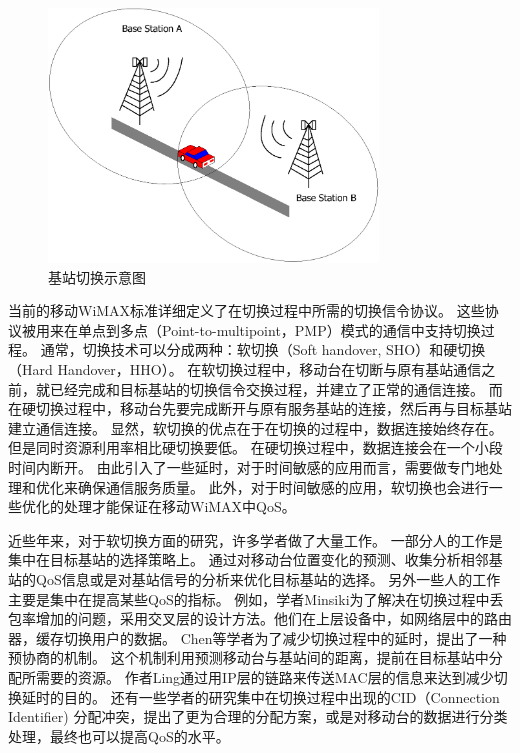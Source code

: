 \begin{figure}[t]
\begin{centering}
\includegraphics[height=6.75cm]{../figures/iccs_handover_bs}
\caption{基站切换示意图}
\label{fig:chap_iccs_handover_bs}
\end{centering}
\end{figure}

当前的移动WiMAX标准详细定义了在切换过程中所需的切换信令协议。
这些协议被用来在单点到多点（Point-to-multipoint，PMP）模式的通信中支持切换过程。
通常，切换技术可以分成两种：软切换（Soft handover, SHO）和硬切换（Hard Handover，HHO）。
在软切换过程中，移动台在切断与原有基站通信之前，就已经完成和目标基站的切换信令交换过程，并建立了正常的通信连接。
而在硬切换过程中，移动台先要完成断开与原有服务基站的连接，然后再与目标基站建立通信连接。
显然，软切换的优点在于在切换的过程中，数据连接始终存在。
但是同时资源利用率相比硬切换要低。
在硬切换过程中，数据连接会在一个小段时间内断开。
由此引入了一些延时，对于时间敏感的应用而言，需要做专门地处理和优化来确保通信服务质量。
此外，对于时间敏感的应用，软切换也会进行一些优化的处理才能保证在移动WiMAX中QoS。


近些年来，对于软切换方面的研究，许多学者做了大量工作。
一部分人的工作是集中在目标基站的选择策略上。
通过对移动台位置变化的预测、收集分析相邻基站的QoS信息或是对基站信号的分析来优化目标基站的选择\cite{Hsieh:INFOCOM2003}\cite{DooHwan:WPC2006}。
另外一些人的工作主要是集中在提高某些QoS的指标。
例如，学者Minsiki为了解决在切换过程中丢包率增加的问题，采用交叉层的设计方法。他们在上层设备中，如网络层中的路由器，缓存切换用户的数据\cite{MinsikICACT2006}。
Chen等学者为了减少切换过程中的延时，提出了一种预协商的机制。
这个机制利用预测移动台与基站间的距离，提前在目标基站中分配所需要的资源\cite{JenHui:AUSWIRELESS:2007}。
作者Ling通过用IP层的链路来传送MAC层的信息来达到减少切换延时的目的\cite{LingVTC2007}。
还有一些学者的研究集中在切换过程中出现的CID（Connection Identifier) 分配冲突，提出了更为合理的分配方案，或是对移动台的数据进行分类处理，最终也可以提高QoS的水平\cite{Hu:TVT2004}\cite{Wenhua:ICC2007}。


